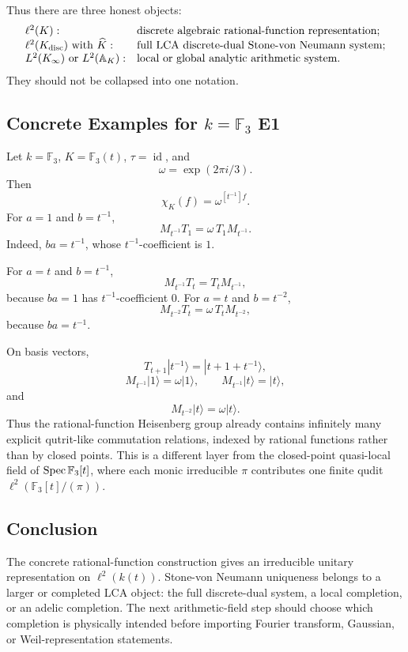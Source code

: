 Thus there are three honest objects:
\[
\begin{array}{ll}
\ell^2(K): & \text{discrete algebraic rational-function representation;}\\
\ell^2(K_{\rm disc})\text{ with }\widehat K: &
  \text{full LCA discrete-dual Stone-von Neumann system;}\\
L^2(K_\infty)\text{ or }L^2(\mathbb A_K): &
  \text{local or global analytic arithmetic system.}
\end{array}
\]
They should not be collapsed into one notation.

\subsection{Concrete Examples for \texorpdfstring{\(k=\mathbb F_3\)}{k=F3} E1}

Let \(k=\mathbb F_3\), \(K=\mathbb F_3(t)\), \(\tau=\operatorname{id}\), and
\[
  \omega=\exp(2\pi i/3).
\]
Then
\[
  \chi_K(f)=\omega^{[t^{-1}]f}.
\]
For \(a=1\) and \(b=t^{-1}\),
\[
  M_{t^{-1}}T_1=\omega\,T_1M_{t^{-1}}.
\]
Indeed, \(ba=t^{-1}\), whose \(t^{-1}\)-coefficient is \(1\).

For \(a=t\) and \(b=t^{-1}\),
\[
  M_{t^{-1}}T_t=T_tM_{t^{-1}},
\]
because \(ba=1\) has \(t^{-1}\)-coefficient \(0\).  For \(a=t\) and
\(b=t^{-2}\),
\[
  M_{t^{-2}}T_t=\omega\,T_tM_{t^{-2}},
\]
because \(ba=t^{-1}\).

On basis vectors,
\[
  T_{t+1}|t^{-1}\rangle=|t+1+t^{-1}\rangle,
\]
\[
  M_{t^{-1}}|1\rangle=\omega|1\rangle,\qquad
  M_{t^{-1}}|t\rangle=|t\rangle,
\]
and
\[
  M_{t^{-2}}|t\rangle=\omega|t\rangle.
\]
Thus the rational-function Heisenberg group already contains infinitely many
explicit qutrit-like commutation relations, indexed by rational functions
rather than by closed points.  This is a different layer from the
closed-point quasi-local field of \(\operatorname{Spec}\mathbb F_3[t]\), where each monic
irreducible \(\pi\) contributes one finite qudit
\(\ell^2(\mathbb F_3[t]/(\pi))\).

\subsection{Conclusion}

The concrete rational-function construction gives an irreducible unitary
representation on \(\ell^2(k(t))\).  Stone-von Neumann uniqueness belongs to a
larger or completed LCA object: the full discrete-dual system, a local
completion, or an adelic completion.  The next arithmetic-field step should
choose which completion is physically intended before importing Fourier
transform, Gaussian, or Weil-representation statements.
